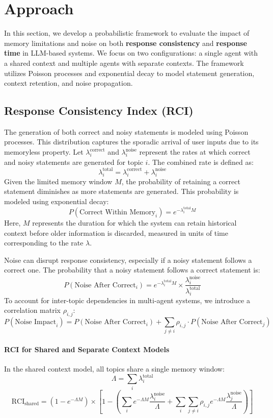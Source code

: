 \documentclass{article}
\begin{document}
\section{Approach}
\label{sec:approach}

In this section, we develop a probabilistic framework to evaluate the impact of memory limitations and noise on both \textbf{response consistency} and \textbf{response time} in LLM-based systems. We focus on two configurations: a single agent with a shared context and multiple agents with separate contexts. The framework utilizes Poisson processes and exponential decay to model statement generation, context retention, and noise propagation.

\subsection{Response Consistency Index (RCI)}

The generation of both correct and noisy statements is modeled using Poisson processes. This distribution captures the sporadic arrival of user inputs due to its memoryless property. Let \( \lambda_i^{\text{correct}} \) and \( \lambda_i^{\text{noise}} \) represent the rates at which correct and noisy statements are generated for topic \( i \). The combined rate is defined as:
\[
\lambda_i^{\text{total}} = \lambda_i^{\text{correct}} + \lambda_i^{\text{noise}}
\]
Given the limited memory window \( M \), the probability of retaining a correct statement diminishes as more statements are generated. This probability is modeled using exponential decay:
\[
P(\text{Correct Within Memory}_i) = e^{-\lambda_i^{\text{total}} M}
\]
Here, \( M \) represents the duration for which the system can retain historical context before older information is discarded, measured in units of time corresponding to the rate \( \lambda \).

Noise can disrupt response consistency, especially if a noisy statement follows a correct one. The probability that a noisy statement follows a correct statement is:
\[
P(\text{Noise After Correct}_i) = e^{-\lambda_i^{\text{total}} M} \times \frac{\lambda_i^{\text{noise}}}{\lambda_i^{\text{total}}}
\]
To account for inter-topic dependencies in multi-agent systems, we introduce a correlation matrix \( \rho_{i,j} \):
\[
P(\text{Noise Impact}_i) = P(\text{Noise After Correct}_i) + \sum_{j \neq i} \rho_{i,j} \cdot P(\text{Noise After Correct}_j)
\]

\paragraph{RCI for Shared and Separate Context Models}
In the shared context model, all topics share a single memory window:
\[
\Lambda = \sum_{i} \lambda_i^{\text{total}}
\]
\[
\text{RCI}_{\text{shared}} = \left(1 - e^{-\Lambda M}\right) \times \left[1 - \left(\sum_{i} e^{-\Lambda M} \frac{\lambda_i^{\text{noise}}}{\Lambda} + \sum_{i} \sum_{j \neq i} \rho_{i,j} e^{-\Lambda M} \frac{\lambda_j^{\text{noise}}}{\Lambda}\right)\right]
\]
\end{document}

